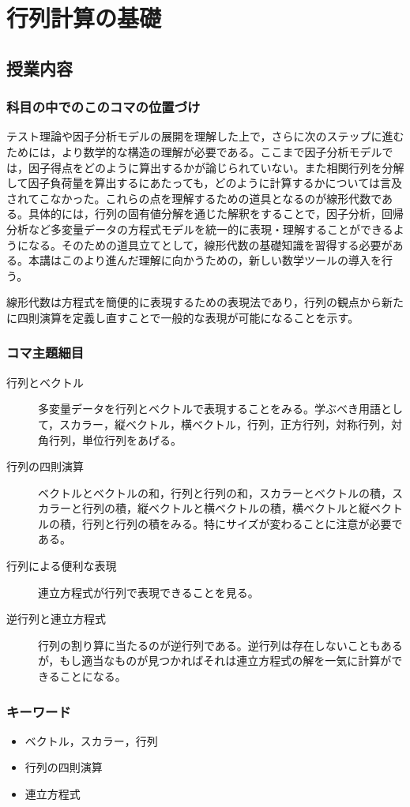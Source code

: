 \section{行列計算の基礎}
\subsection{授業内容}
\subsubsection{科目の中でのこのコマの位置づけ}
テスト理論や因子分析モデルの展開を理解した上で，さらに次のステップに進むためには，より数学的な構造の理解が必要である。ここまで因子分析モデルでは，因子得点をどのように算出するかが論じられていない。また相関行列を分解して因子負荷量を算出するにあたっても，どのように計算するかについては言及されてこなかった。これらの点を理解するための道具となるのが線形代数である。具体的には，行列の固有値分解を通じた解釈をすることで，因子分析，回帰分析など多変量データの方程式モデルを統一的に表現・理解することができるようになる。そのための道具立てとして，線形代数の基礎知識を習得する必要がある。本講はこのより進んだ理解に向かうための，新しい数学ツールの導入を行う。

線形代数は方程式を簡便的に表現するための表現法であり，行列の観点から新たに四則演算を定義し直すことで一般的な表現が可能になることを示す。

\subsubsection{コマ主題細目}
\begin{description}
    \item[行列とベクトル] 多変量データを行列とベクトルで表現することをみる。学ぶべき用語として，スカラー，縦ベクトル，横ベクトル，行列，正方行列，対称行列，対角行列，単位行列をあげる。
    \item[行列の四則演算] ベクトルとベクトルの和，行列と行列の和，スカラーとベクトルの積，スカラーと行列の積，縦ベクトルと横ベクトルの積，横ベクトルと縦ベクトルの積，行列と行列の積をみる。特にサイズが変わることに注意が必要である。
    \item[行列による便利な表現] 連立方程式が行列で表現できることを見る。
    \item[逆行列と連立方程式] 行列の割り算に当たるのが逆行列である。逆行列は存在しないこともあるが，もし適当なものが見つかればそれは連立方程式の解を一気に計算ができることになる。
\end{description}
\subsubsection{キーワード}
\begin{itemize}
\item ベクトル，スカラー，行列
\item 行列の四則演算
\item 連立方程式
\end{itemize}
